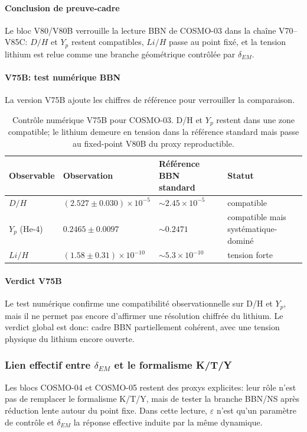 \documentclass[11pt,a4paper]{article}
\begin{document}
\paragraph{Conclusion de preuve-cadre}
Le bloc V80/V80B verrouille la lecture BBN de COSMO-03 dans la chaîne V70--V85C: $D/H$ et $Y_p$ restent compatibles, $Li/H$ passe au point fixé, et la tension lithium est relue comme une branche géométrique contrôlée par $\delta_{EM}$.

\paragraph{V75B: test numérique BBN}
La version V75B ajoute les chiffres de référence pour verrouiller la comparaison.

\begin{table}[htbp]
\centering
\begin{tabular}{>{\raggedright\arraybackslash}p{2.8cm} >{\centering\arraybackslash}p{3.2cm} >{\centering\arraybackslash}p{3.2cm} >{\centering\arraybackslash}p{2.6cm}}
\toprule
Observable & Observation & Référence BBN standard & Statut \\
\midrule
$D/H$ & $(2.527 \pm 0.030) \times 10^{-5}$ & $\sim 2.45 \times 10^{-5}$ & compatible \\
$Y_p$ (He-4) & $0.2465 \pm 0.0097$ & $\sim 0.2471$ & compatible mais systématique-dominé \\
$Li/H$ & $(1.58 \pm 0.31) \times 10^{-10}$ & $\sim 5.3 \times 10^{-10}$ & tension forte \\
\bottomrule
\end{tabular}
\caption{Contrôle numérique V75B pour COSMO-03. D/H et $Y_p$ restent dans une zone compatible; le lithium demeure en tension dans la référence standard mais passe au fixed-point V80B du proxy reproductible.}
\end{table}

\paragraph{Verdict V75B}
Le test numérique confirme une compatibilité observationnelle sur D/H et $Y_p$, mais il ne permet pas encore d’affirmer une résolution chiffrée du lithium. Le verdict global est donc: cadre BBN partiellement cohérent, avec une tension physique du lithium encore ouverte.

\subsubsection{Lien effectif entre $\delta_{EM}$ et le formalisme K/T/Y}
Les blocs COSMO-04 et COSMO-05 restent des proxys explicites: leur rôle n'est pas de remplacer le formalisme K/T/Y, mais de tester la branche BBN/NS après réduction lente autour du point fixe. Dans cette lecture, $\varepsilon$ n'est qu'un paramètre de contrôle et $\delta_{EM}$ la réponse effective induite par la même dynamique.
\end{document}
